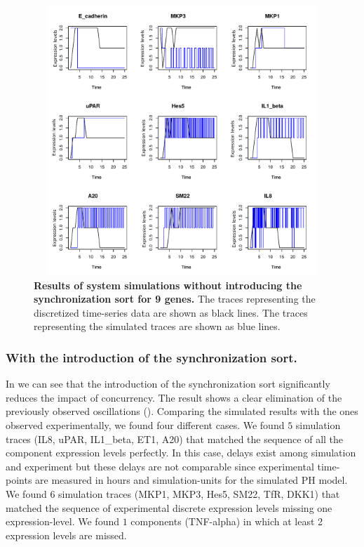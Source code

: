 \begin{figure}[H]
\centering
\includegraphics[width=5in,height=4in]{images/resultWOS.pdf}
\caption{{\bf Results of system simulations without introducing the synchronization sort for 9 genes.} The 
traces representing the discretized time-series data are shown as black lines.  The traces representing the simulated traces are shown as blue lines.}
\label{fig:rwos}
\end{figure}

\subsubsection{With the introduction of the synchronization sort.}
In  we can see that the introduction of the synchronization sort significantly reduces the 
impact of concurrency. The result shows  a 
clear elimination of the previously observed oscillations (). 
Comparing the simulated results with the ones observed experimentally, we found four different cases.
We found $5$ simulation traces (IL8, uPAR, IL1\_beta, ET1, A20) that matched the sequence of all the component expression levels perfectly.  In this case, delays exist among simulation and experiment but 
these delays are not comparable since experimental time-points are measured in hours and simulation-units for the simulated PH model.
We found $6$ simulation traces (MKP1, MKP3, Hes5, SM22, TfR, DKK1) that matched the sequence of experimental discrete expression levels missing one expression-level.
We found $1$ components (TNF-alpha) in which at least 2 expression levels are missed.

